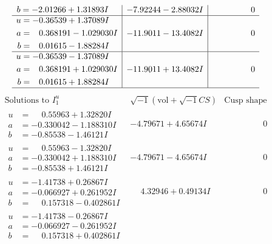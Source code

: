 \documentclass[1p]{elsarticle_modified}
\theoremstyle{definition}
\newcommand{\I}{\sqrt{-1}}
\begin{document}
$$\begin{array}{c|c|c}
\begin{aligned}
b &= -2.01266 + 1.31893 I\end{aligned}
 & -7.92244 - 2.88032 I & \phantom{-0.000000 } 0 \\ \hline\begin{aligned}
u &= -0.36539 + 1.37089 I \\
a &= \phantom{-}0.368191 - 1.029030 I \\
b &= \phantom{-}0.01615 - 1.88284 I\end{aligned}
 & -11.9011 - 13.4082 I & \phantom{-0.000000 } 0 \\ \hline\begin{aligned}
u &= -0.36539 - 1.37089 I \\
a &= \phantom{-}0.368191 + 1.029030 I \\
b &= \phantom{-}0.01615 + 1.88284 I\end{aligned}
 & -11.9011 + 13.4082 I & \phantom{-0.000000 } 0\\
 \hline 
 \end{array}$$\newpage$$\begin{array}{c|c|c}  
\text{Solutions to }I^u_{1}& \I (\text{vol} + \sqrt{-1}CS) & \text{Cusp shape}\\
 \hline 
\begin{aligned}
u &= \phantom{-}0.55963 + 1.32820 I \\
a &= -0.330042 - 1.188310 I \\
b &= -0.85538 - 1.46121 I\end{aligned}
 & -4.79671 + 4.65674 I & \phantom{-0.000000 } 0 \\ \hline\begin{aligned}
u &= \phantom{-}0.55963 - 1.32820 I \\
a &= -0.330042 + 1.188310 I \\
b &= -0.85538 + 1.46121 I\end{aligned}
 & -4.79671 - 4.65674 I & \phantom{-0.000000 } 0 \\ \hline\begin{aligned}
u &= -1.41738 + 0.26867 I \\
a &= -0.066927 + 0.261952 I \\
b &= \phantom{-}0.157318 - 0.402861 I\end{aligned}
 & \phantom{-}4.32946 + 0.49134 I & \phantom{-0.000000 } 0 \\ \hline\begin{aligned}
u &= -1.41738 - 0.26867 I \\
a &= -0.066927 - 0.261952 I \\
b &= \phantom{-}0.157318 + 0.402861 I\end{aligned}

\end{array}$$
\end{document}
